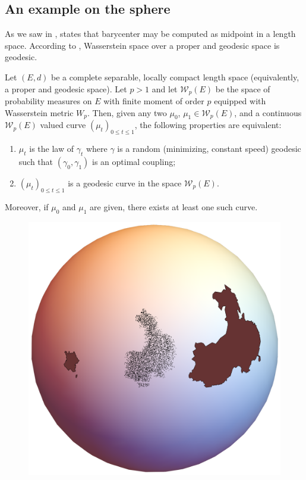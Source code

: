 \subsection{An example on the sphere}

As we saw in ,
 states that barycenter may be computed as midpoint in a length space.
According to \cite[Corollary 7.22]{villani2008optimal}, Wasserstein space over a proper and geodesic space is geodesic.

\begin{thm}
	\label{thm:geodesic_Wasserstein_space}
	Let \( ( E , d ) \) be a complete separable, locally compact length space (equivalently, a proper and geodesic space).
	Let \( p > 1 \) and let \( \mathcal{W}_p(E) \) be the space of probability measures
	on \( E \) with finite moment of order \( p \)
	equipped with Wasserstein metric \( W _ { p } \).
	Then, given any two \( \mu _ { 0 }\), \( \mu _ { 1 } \in \mathcal{W}_p(E) \),
	and a continuous \( \mathcal{W}_p(E) \) valued curve \( \left( \mu _ { t } \right) _ { 0 \leq t \leq 1 } \),
	the following properties are equivalent:
	\begin{enumerate}
		\item \( \mu _ { t } \) is the law of \(\gamma _ { t } \) where \( \gamma \) is a random (minimizing, constant speed)
		      geodesic such that \( \left( \gamma _ { 0 } , \gamma _ { 1 } \right) \) is an optimal coupling;
		\item \( \left( \mu _ { t } \right) _ { 0 \leq t \leq 1 } \) is a geodesic curve in the space \( \mathcal{W}_p(E) \).
	\end{enumerate}
	Moreover, if \( \mu _ { 0 } \) and \( \mu _ { 1 } \) are given, there exists at least one such curve.
\end{thm}

\begin{figure}
	\includegraphics[width=\linewidth]{Chapters/OPT_sphere.pdf}
\end{figure}

